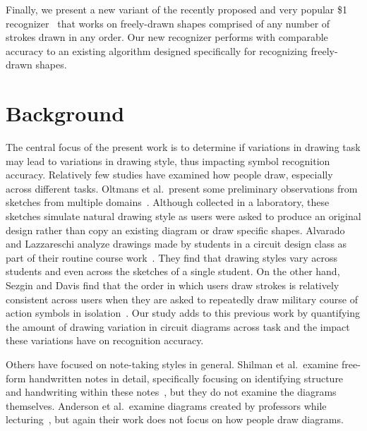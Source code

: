 \documentclass[final,5p,twocolumn]{elsarticle}
\begin{document}
Finally, we present a new variant of
the recently proposed and very popular \$1 recognizer~\cite{wobbrock07}
that works on freely-drawn shapes comprised of any number of strokes
drawn in any order.  Our new recognizer performs with
comparable accuracy to an existing algorithm designed specifically
for recognizing freely-drawn shapes.

\section{Background}

The central focus of the present work is to determine if variations
in drawing task may lead to variations in 
drawing style, thus impacting symbol recognition accuracy.
Relatively few studies have examined how people
draw, especially across different tasks.  Oltmans et al.~present some preliminary observations
from sketches from multiple domains~\cite{oltmans04}.
Although collected in a laboratory, these sketches simulate natural
drawing style as users were asked to produce an original design rather
than copy an existing diagram or draw specific shapes.  Alvarado and
Lazzareschi analyze drawings made by students in a circuit design
class as part of their routine course work~\cite{alvarado07}.  
They find that drawing styles
vary across students and even across the sketches of a single student.  On
the other hand, Sezgin and Davis find that the order in which users draw
strokes is relatively consistent across users when they are asked
to repeatedly draw military course of action symbols in
isolation~\cite{sezgin07}.  Our study adds to this 
previous work by quantifying the amount
of drawing variation in circuit diagrams across task and the 
impact these variations have on recognition accuracy.

Others have focused on note-taking styles in general.
Shilman et al.~examine free-form
handwritten notes in detail, specifically focusing on identifying
structure and handwriting within these
notes~\cite{shilman03}, but they do not examine the
diagrams themselves. Anderson et al.~examine
diagrams created by professors while
lecturing~\cite{anderson05}, but again their work does not
focus on how people draw diagrams.
\end{document}
